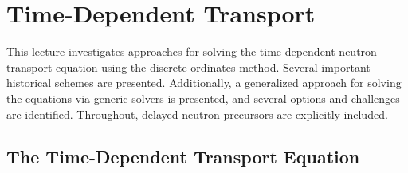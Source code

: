 \chapter{Time-Dependent Transport}
\label{lec:time_dependent_transport}

This lecture investigates approaches for solving the time-dependent neutron 
transport equation using the discrete ordinates method.  Several 
important historical schemes are presented. Additionally, a generalized approach for 
solving the equations via generic solvers is presented, and several options
and challenges are identified.  Throughout, delayed neutron precursors 
are explicitly included.

\section{The Time-Dependent Transport Equation}

